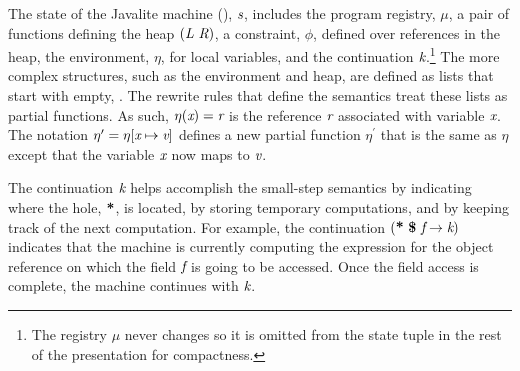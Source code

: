 The state of the Javalite machine (),
$\emph{s}$, includes the program registry, $\mu$, a pair of functions defining the heap
$(\emph{L}\ \emph{R})$, a constraint,
$\phi$, defined over references in the heap, the environment, $\eta$,
for local variables, and the continuation $\emph{k}$.\footnote{The registry $\mu$ never changes so it is omitted from the state tuple in the rest of the presentation for compactness.}  The more
complex structures, such as the environment and heap, are defined as lists that
start with empty, . The rewrite rules that define the
semantics treat these lists as partial functions. As such,
$\eta(\emph{x}) = \emph{r}$ is the reference $\emph{r}$ associated with variable
$\emph{x}$. The notation $\eta^\prime = \eta[\emph{x} \mapsto
  \emph{v}]$ defines a new partial function $\eta^\prime$ that is
the same as $\eta$ except that the variable $\emph{x}$ now maps to
$\emph{v}$.

The continuation $\emph{k}$ helps accomplish the small-step semantics
by indicating where the hole, $\textbf{*}$, is located, by storing
temporary computations, and by keeping track of the next
computation. For example, the continuation
$\lp\cfgt{*}\ \cfgt{\$}\ \cfgnt{f} \rightarrow \cfgnt{k}\rp$ indicates
that the machine is currently computing the expression for the object
reference on which the field $\emph{f}$ is going to be accessed. Once
the field access is complete, the machine continues with $\emph{k}$.




